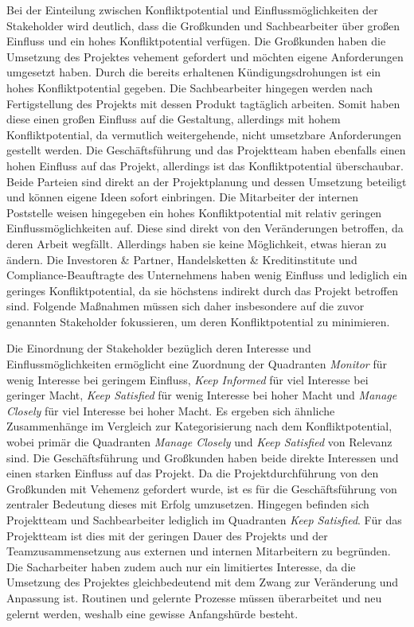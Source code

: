 Bei der Einteilung zwischen Konfliktpotential und Einflussmöglichkeiten der Stakeholder wird deutlich, dass die Großkunden und Sachbearbeiter über großen Einfluss und ein hohes Konfliktpotential verfügen. Die Großkunden haben die Umsetzung des Projektes vehement gefordert und möchten eigene Anforderungen umgesetzt haben. Durch die bereits erhaltenen Kündigungsdrohungen ist ein hohes Konfliktpotential gegeben. Die Sachbearbeiter hingegen werden nach Fertigstellung des Projekts mit dessen Produkt tagtäglich arbeiten. Somit haben diese einen großen Einfluss auf die Gestaltung, allerdings mit hohem Konfliktpotential, da vermutlich weitergehende, nicht umsetzbare Anforderungen gestellt werden. Die Geschäftsführung und das Projektteam haben ebenfalls einen hohen Einfluss auf das Projekt, allerdings ist das Konfliktpotential überschaubar. Beide Parteien sind direkt an der Projektplanung und dessen Umsetzung beteiligt und können eigene Ideen sofort einbringen. Die Mitarbeiter der internen Poststelle weisen hingegeben ein hohes Konfliktpotential mit relativ geringen Einflussmöglichkeiten auf. Diese sind direkt von den Veränderungen betroffen, da deren Arbeit wegfällt. Allerdings haben sie keine Möglichkeit, etwas hieran zu ändern. Die Investoren \& Partner, Handelsketten \& Kreditinstitute und Compliance-Beauftragte des Unternehmens haben wenig Einfluss und lediglich ein geringes Konfliktpotential, da sie höchstens indirekt durch das Projekt betroffen sind. Folgende Maßnahmen müssen sich daher insbesondere auf die zuvor genannten Stakeholder fokussieren, um deren Konfliktpotential zu minimieren.
\vspace{10pt}

Die Einordnung der Stakeholder bezüglich deren Interesse und Einflussmöglichkeiten ermöglicht eine Zuordnung der Quadranten \textit{Monitor} für wenig Interesse bei geringem Einfluss, \textit{Keep Informed} für viel Interesse bei geringer Macht, \textit{Keep Satisfied} für wenig Interesse bei hoher Macht und \textit{Manage Closely} für viel Interesse bei hoher Macht. Es ergeben sich ähnliche Zusammenhänge im Vergleich zur Kategorisierung nach dem Konfliktpotential, wobei primär die Quadranten \textit{Manage Closely} und \textit{Keep Satisfied} von Relevanz sind. Die Geschäftsführung und Großkunden haben beide direkte Interessen und einen starken Einfluss auf das Projekt. Da die Projektdurchführung von den Großkunden mit Vehemenz gefordert wurde, ist es für die Geschäftsführung von zentraler Bedeutung dieses mit Erfolg umzusetzen. Hingegen befinden sich Projektteam und Sachbearbeiter lediglich im Quadranten \textit{Keep Satisfied}. Für das Projektteam ist dies mit der geringen Dauer des Projekts und der Teamzusammensetzung aus externen und internen Mitarbeitern zu begründen. Die Sacharbeiter haben zudem auch nur ein limitiertes Interesse, da die Umsetzung des Projektes gleichbedeutend mit dem Zwang zur Veränderung und Anpassung ist. Routinen und gelernte Prozesse müssen überarbeitet und neu gelernt werden, weshalb eine gewisse Anfangshürde besteht.
\vspace{10pt}

